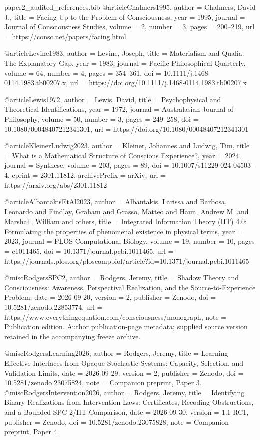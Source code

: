 \begin{filecontents*}[overwrite]{paper2_audited_references.bib}
@article{Chalmers1995,
  author = {Chalmers, David J.},
  title = {Facing Up to the Problem of Consciousness},
  year = {1995},
  journal = {Journal of Consciousness Studies},
  volume = {2},
  number = {3},
  pages = {200--219},
  url = {https://consc.net/papers/facing.html}
}

@article{Levine1983,
  author = {Levine, Joseph},
  title = {Materialism and Qualia: The Explanatory Gap},
  year = {1983},
  journal = {Pacific Philosophical Quarterly},
  volume = {64},
  number = {4},
  pages = {354--361},
  doi = {10.1111/j.1468-0114.1983.tb00207.x},
  url = {https://doi.org/10.1111/j.1468-0114.1983.tb00207.x}
}

@article{Lewis1972,
  author = {Lewis, David},
  title = {Psychophysical and Theoretical Identifications},
  year = {1972},
  journal = {Australasian Journal of Philosophy},
  volume = {50},
  number = {3},
  pages = {249--258},
  doi = {10.1080/00048407212341301},
  url = {https://doi.org/10.1080/00048407212341301}
}

@article{KleinerLudwig2023,
  author = {Kleiner, Johannes and Ludwig, Tim},
  title = {What is a Mathematical Structure of Conscious Experience?},
  year = {2024},
  journal = {Synthese},
  volume = {203},
  pages = {89},
  doi = {10.1007/s11229-024-04503-4},
  eprint = {2301.11812},
  archivePrefix = {arXiv},
  url = {https://arxiv.org/abs/2301.11812}
}

@article{AlbantakisEtAl2023,
  author = {Albantakis, Larissa and Barbosa, Leonardo and Findlay, Graham and Grasso, Matteo and Haun, Andrew M. and Marshall, William and others},
  title = {Integrated Information Theory ({IIT}) 4.0: Formulating the properties of phenomenal existence in physical terms},
  year = {2023},
  journal = {PLOS Computational Biology},
  volume = {19},
  number = {10},
  pages = {e1011465},
  doi = {10.1371/journal.pcbi.1011465},
  url = {https://journals.plos.org/ploscompbiol/article?id=10.1371/journal.pcbi.1011465}
}


@misc{RodgersSPC2,
 author = {Rodgers, Jeremy},
 title = {Shadow Theory and Consciousness: Awareness, Perspectival Realization, and the Source-to-Experience Problem},
 date = {2026-09-20},
 version = {2},
 publisher = {Zenodo},
 doi = {10.5281/zenodo.22853774},
 url = {https://www.everythingequation.com/consciousness/monograph},
 note = {Publication edition. Author publication-page metadata; supplied source version retained in the accompanying freeze archive.}
}


@misc{RodgersLearning2026,
 author = {Rodgers, Jeremy},
 title = {Learning Effective Interfaces from Opaque Stochastic Systems: Capacity, Selection, and Validation Limits},
 date = {2026-09-29},
 version = {2},
 publisher = {Zenodo},
 doi = {10.5281/zenodo.23075824},
 note = {Companion preprint, Paper 3.}
}
@misc{RodgersIntervention2026,
 author = {Rodgers, Jeremy},
 title = {Identifying Binary Realizations from Intervention Laws: Certificates, Recoding Obstructions, and a Bounded {SPC-2}/{IIT} Comparison},
 date = {2026-09-30},
 version = {1.1-RC1},
 publisher = {Zenodo},
 doi = {10.5281/zenodo.23075828},
 note = {Companion preprint, Paper 4.}
}


\end{filecontents*}
